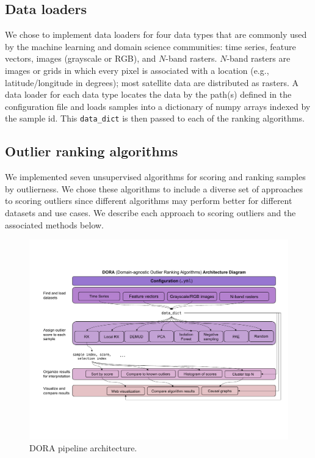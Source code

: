 \documentclass[utf8]{frontiersFPHY} %
\begin{document}
\subsection{Data loaders} 
We chose to implement data loaders for four
data types that are commonly used by the machine learning and domain science
communities: time series, feature vectors, images (grayscale or RGB), and 
$N$-band rasters. $N$-band rasters are images or grids in which every pixel
is associated with a location (e.g., latitude/longitude in degrees); 
most satellite data are distributed as rasters.
A data loader for each data type locates the data by the path(s)
defined in the configuration file and loads samples into a dictionary of numpy
arrays indexed by the sample id. This \texttt{data\_dict} is then passed to 
each of the ranking algorithms.

\subsection{Outlier ranking algorithms} 
We implemented seven unsupervised 
algorithms for scoring and 
ranking samples by outlierness. 
We chose these algorithms to include a diverse
set of approaches to scoring outliers since different algorithms may  
perform better for different datasets and use cases. 
We describe each
approach to scoring outliers and the associated methods below.

\begin{figure}
\centering
\includegraphics[width=\linewidth]{figures/dora-system-diagram-v5.pdf}
\caption{DORA pipeline architecture.}
\label{fig:dora}
\end{figure}
\end{document}
